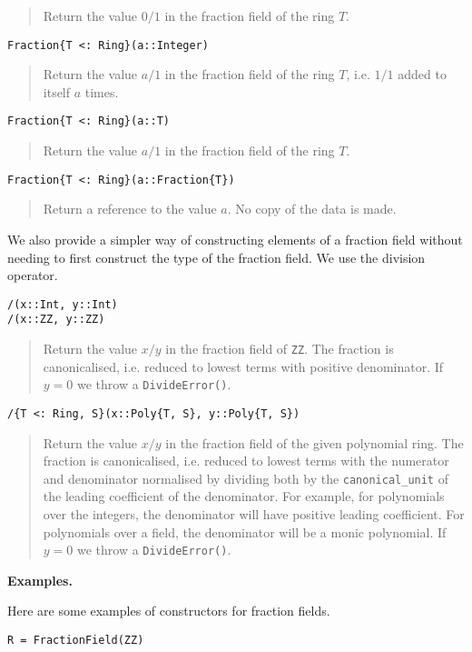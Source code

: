 \documentclass[a4paper,10pt]{article}
\newcommand{\code}{\lstinline}
\newcommand{\desc}[1]{\vspace{-3mm}\begin{quote}#1\end{quote}}
\begin{document}
{{{\desc{Return the value $0/1$ in the fraction field of the ring $T$.}

\begin{lstlisting}
Fraction{T <: Ring}(a::Integer)
\end{lstlisting}

\desc{Return the value $a/1$ in the fraction field of the ring $T$, i.e.
$1/1$ added to itself $a$ times.}

\begin{lstlisting}
Fraction{T <: Ring}(a::T)
\end{lstlisting}

\desc{Return the value $a/1$ in the fraction field of the ring $T$.}

\begin{lstlisting}
Fraction{T <: Ring}(a::Fraction{T})
\end{lstlisting}

\desc{Return a reference to the value $a$. No copy of the data is made.}

We also provide a simpler way of constructing elements of a fraction field
without needing to first construct the type of the fraction field. We use
the division operator.

\begin{lstlisting}
/(x::Int, y::Int)
/(x::ZZ, y::ZZ)
\end{lstlisting}

\desc{Return the value $x/y$ in the fraction field of \code{ZZ}. The fraction
is canonicalised, i.e. reduced to lowest terms with positive denominator. If
$y = 0$ we throw a \code{DivideError()}.}

\begin{lstlisting}
/{T <: Ring, S}(x::Poly{T, S}, y::Poly{T, S})
\end{lstlisting}

\desc{Return the value $x/y$ in the fraction field of the given polynomial
ring. The fraction is canonicalised, i.e. reduced to lowest terms with the
numerator and denominator normalised by dividing both by the
\code{canonical_unit} of the leading coefficient of the denominator. For
example, for polynomials over the integers, the denominator will have
positive leading coefficient. For polynomials over a field, the denominator
will be a monic polynomial. If $y = 0$ we throw a \code{DivideError()}.}

\textbf{Examples.}

Here are some examples of constructors for fraction fields.

\begin{lstlisting}
R = FractionField(ZZ)


\end{lstlisting}}}}
\end{document}
